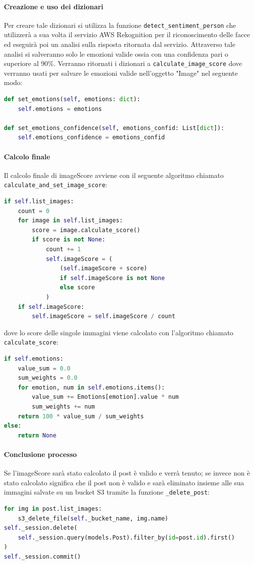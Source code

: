\paragraph{Creazione e uso dei dizionari} \aCapo{}
Per creare tale dizionari si utilizza la funzione \verb+detect_sentiment_person+ che utilizzerà a sua volta il servizio AWS Rekognition per il riconoscimento delle facce ed eseguirà poi un analisi sulla risposta ritornata dal servizio. Attraverso tale analisi si salveranno solo le emozioni valide ossia con una confidenza pari o superiore al 90\%. Verranno ritornati i dizionari a \verb+calculate_image_score+ dove verranno usati per salvare le emozioni valide nell'oggetto "Image" nel seguente modo:
\begin{lstlisting}[language=Python]
def set_emotions(self, emotions: dict):
    self.emotions = emotions

def set_emotions_confidence(self, emotions_confid: List[dict]):
    self.emotions_confidence = emotions_confid
\end{lstlisting}
\paragraph{Calcolo finale} \aCapo{}
Il calcolo finale di imageScore avviene con il seguente algoritmo chiamato \verb+calculate_and_set_image_score+: 
\begin{lstlisting}[language=Python]
if self.list_images:
    count = 0
    for image in self.list_images:
        score = image.calculate_score()
        if score is not None:
            count += 1
            self.imageScore = (
                (self.imageScore + score)
                if self.imageScore is not None
                else score
            )
    if self.imageScore:
        self.imageScore = self.imageScore / count
\end{lstlisting}
dove lo score delle singole immagini viene calcolato con l'algoritmo chiamato \verb+calculate_score+:
\begin{lstlisting}[language=Python]
if self.emotions:
    value_sum = 0.0
    sum_weights = 0.0
    for emotion, num in self.emotions.items():
        value_sum += Emotions[emotion].value * num
        sum_weights += num
    return 100 * value_sum / sum_weights
else:
    return None
\end{lstlisting}
\paragraph{Conclusione processo} \aCapo{}
Se l'imageScore sarà stato calcolato il post è valido e verrà tenuto; se invece non è stato calcolato significa che il post non è valido e sarà eliminato insieme alle sua immagini salvate su un bucket S3 tramite la funzione \verb+_delete_post+:
\begin{lstlisting}[language=Python]
for img in post.list_images:
    s3_delete_file(self._bucket_name, img.name)
self._session.delete(
    self._session.query(models.Post).filter_by(id=post.id).first()
)
self._session.commit()
\end{lstlisting}

